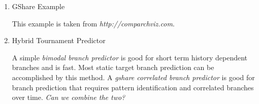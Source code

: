 \documentclass[12pt]{article}
\newenvironment{QandA}{\begin{enumerate}[label=\bfseries\arabic*.]\bfseries}
                      {\end{enumerate}}
\newenvironment{answered}{\par\quad\normalfont}{}
\begin{document}
\begin{QandA}
\begin{answered}
In the \textit{example} below, the modulo three conditional branch is repeated twice as seen in \textit{(i) and (ii)}, but they are separated by some unrelated, unpredictable set of instructions. In this case, the above two methods would not be able to effectively predict the right branch targets even though it has previously seen the same instructions.

\begin{equation*}
\begin{split}
    & \text{for(i=0;i$<$10000;i++)} \\
    & \{ \\
    & \quad\textbf{if(i\%3==0)}\ \{ \quad\quad \textit{--- (i)}\\
    & \quad\textit{...} \\
    & \quad \} \\
    & \quad ... \\
    & \quad \textit{... unrelated sequence ...} \\
    & \quad ... \\
    & \quad\textbf{if(i\%3==0)}\ \{ \quad\quad \textit{--- (ii)}\\
    & \quad\textit{...} \\
    & \quad \} \\ 
    & \}
\end{split}
\end{equation*}

GShare maintains a \textbf{Branch History Register (BHR)} in addition to a \textbf{Branch History Table (BHT)}, which typically will use \textbf{2-bit Saturating Counters}.

\textit{How do we incorporate this idea of history and correlation into our predictions?}

Instead of using just the \textit{Program Counter (PC)} as the index into the \textit{Branch History Table (BHT)}, use PC $\oplus$ BHR (xor operation) as the index to the BHT. This will result in more unique \textit{keys / indexes} into the table.

We need to train the counter (BHT) and the BHR (\textit{Branch History Register}) after each branch instruction.
\end{answered}

\item GShare Example
\begin{answered}
This example is taken from \textit{http://comparchviz.com}.
\end{answered}

\item Hybrid Tournament Predictor
\begin{answered}
A simple \textit{bimodal branch predictor} is good for short term history dependent branches and is fast. Most static target branch prediction can be accomplished by this method. A \textit{gshare correlated branch predictor} is good for branch prediction that requires pattern identification and correlated branches over time. \textit{Can we combine the two?}


\end{answered}
\end{QandA}
\end{document}
